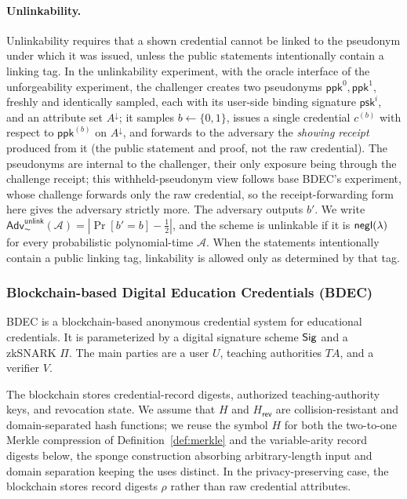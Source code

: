 \paragraph{Unlinkability.}
Unlinkability requires that a shown credential cannot be linked to the pseudonym under which it was issued, unless the public statements intentionally contain a linking tag. In the unlinkability experiment, with the oracle interface of the unforgeability experiment, the challenger creates two pseudonyms \(\mathsf{ppk}^0,\mathsf{ppk}^1\), freshly and identically sampled, each with its user-side binding signature \(\mathsf{psk}^i\), and an attribute set \(A^\downarrow\); it samples \(b\leftarrow\{0,1\}\), issues a single credential \(c^{(b)}\) with respect to \(\mathsf{ppk}^{(b)}\) on \(A^\downarrow\), and forwards to the adversary the \emph{showing receipt} produced from it (the public statement and proof, not the raw credential). The pseudonyms are internal to the challenger, their only exposure being through the challenge receipt; this withheld-pseudonym view follows base BDEC's experiment, whose challenge forwards only the raw credential, so the receipt-forwarding form here gives the adversary strictly more. The adversary outputs \(b'\). We write \(\mathsf{Adv}^{\mathsf{unlink}}_{\AC}(\mathcal A)=\left|\Pr[b'=b]-\tfrac12\right|\), and the scheme is unlinkable if it is \(\mathsf{negl}(\lambda)\) for every probabilistic polynomial-time \(\mathcal A\). When the statements intentionally contain a public linking tag, linkability is allowed only as determined by that tag.

\subsubsection{Blockchain-based Digital Education Credentials (BDEC)}
BDEC is a blockchain-based anonymous credential system for educational credentials. It is parameterized by a digital signature scheme $\mathsf{Sig}$ and a zkSNARK $\Pi$. The main parties are a user $U$, teaching authorities $TA$, and a verifier $V$.

The blockchain stores credential-record digests, authorized teaching-authority keys, and revocation state. We assume that $H$ and $H_{\mathsf{rev}}$ are collision-resistant and domain-separated hash functions; we reuse the symbol $H$ for both the two-to-one Merkle compression of Definition~\ref{def:merkle} and the variable-arity record digests below, the sponge construction absorbing arbitrary-length input and domain separation keeping the uses distinct. In the privacy-preserving case, the blockchain stores record digests $\rho$ rather than raw credential attributes.

